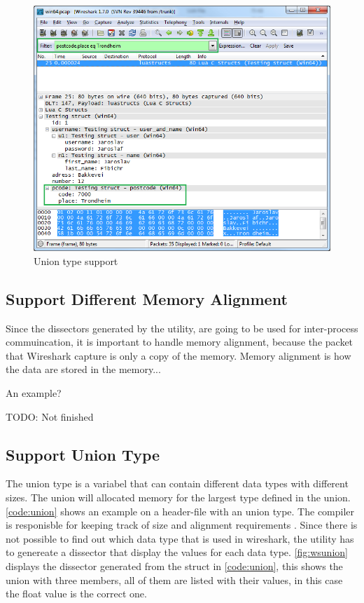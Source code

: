 \begin{figure}[ht]
	\center
	\includegraphics[width=\textwidth]{./sprints/img/wireshark_filter}
	\caption{Union type support\label{fig:wsfilter}}
\end{figure}

\subsection{Support Different Memory Alignment}
Since the dissectors generated by the utility, are going to be used for inter-process commuincation, it is important to handle memory alignment, because the packet that Wireshark capture is only a copy of the memory. Memory alignment is how the data are stored in the memory... 

An example?

TODO: Not finished

\subsection{Support Union Type}
The \gls{union} type is a variabel that can contain different data types with 
different sizes. The \gls{union} will allocated memory for the largest type defined 
in the \gls{union}. \autoref{code:union} shows an example on a header-file with an 
\gls{union} type. The compiler is responisble for keeping track of size and 
alignment requirements\cite[p.147]{Kerninghan1988} . Since there is not 
possible to find out which data type that is used in \Gls{wireshark}, the \gls{utility} 
has to genereate a \gls{dissector} that display the values for each data type. 
\autoref{fig:wsunion} displays the \gls{dissector} generated from the struct in 
\autoref{code:union}, this shows the \gls{union} with three members, all of them are 
listed with their values, in this case the float value is the correct one.


